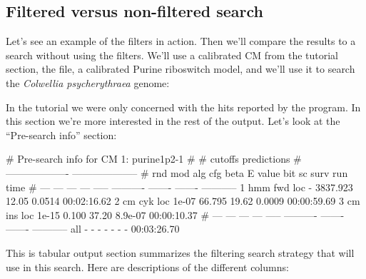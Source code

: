 \subsection{Filtered versus non-filtered search}

Let's see an example of the filters in action. Then we'll compare the
results to a search without using the filters. We'll use a calibrated
CM from the tutorial section, the  file, a
calibrated Purine riboswitch model, and we'll use it to search the
\emph{Colwellia psycherythraea} genome:


In the tutorial we were only concerned with the hits reported by the
program. In this section we're more interested in the rest of the
output. Let's look at the ``Pre-search info'' section:

\begin{sreoutput}
# Pre-search info for CM 1: purine1p2-1
#
#                                  cutoffs            predictions     
#                            -------------------  --------------------
# rnd  mod  alg  cfg   beta     E value   bit sc     surv     run time
# ---  ---  ---  ---  -----  ----------  -------  -------  -----------
    1  hmm  fwd  loc      -    3837.923    12.05   0.0514  00:02:16.62
    2   cm  cyk  loc  1e-07      66.795    19.62   0.0009  00:00:59.69
    3   cm  ins  loc  1e-15       0.100    37.20  8.9e-07  00:00:10.37
# ---  ---  ---  ---  -----  ----------  -------  -------  -----------
  all    -    -    -      -           -        -        -  00:03:26.70
\end{sreoutput}

This is tabular output section summarizes the filtering search
strategy that  will use in this search. Here are
descriptions of the different columns:

